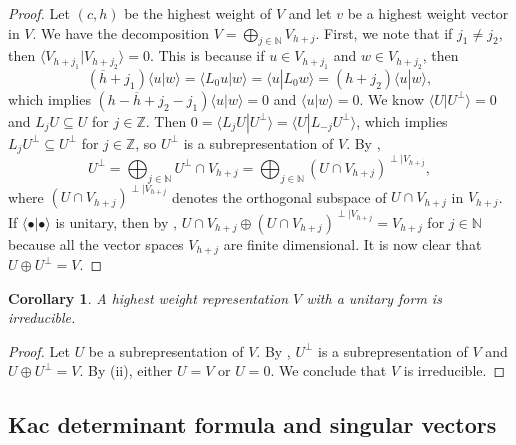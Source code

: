 \documentclass[a4paper, 12pt, reqno]{amsart}
\newtheorem{corollary}[theorem]{Corollary}
\theoremstyle{remark}
\numberwithin{equation}{subsection}
\begin{document}
\begin{proof}
  Let $(c, h)$ be the highest weight of $V$ and let $v$ be a highest weight vector in $V$.
  We have the decomposition $V = \bigoplus_{j \in \mathbb{N}}V_{h + j}$.
  First, we note that if $j_1 \neq j_2$, then $\langle V_{h + j_1}| V_{h + j_2}\rangle = 0$.
  This is because if $u \in V_{h + j_1}$ and $w \in V_{h + j_2}$, then
  \begin{equation*}
    (\overline{h} + j_1)\langle u| w\rangle = \langle L_0u| w\rangle = \langle u| L_0w\rangle = (h + j_2)\langle u| w\rangle,
  \end{equation*}
  which implies $(h - \overline{h} + j_2 - j_1)\langle u| w\rangle = 0$ and $\langle u| w\rangle = 0$.
  We know $\langle U| U^{\perp}\rangle = 0$ and $L_jU \subseteq U$ for $j \in \mathbb{Z}$.
  Then $0 = \langle L_jU| U^{\perp}\rangle = \langle U| L_{-j}U^{\perp}\rangle$, which implies $L_jU^{\perp} \subseteq U^{\perp}$ for $j \in \mathbb{Z}$, so $U^{\perp}$ is a subrepresentation of $V$.
  By ,
  \begin{equation*}
     U^{\perp} = \bigoplus_{j \in \mathbb{N}}U^{\perp} \cap V_{h + j} = \bigoplus_{j \in \mathbb{N}}(U \cap V_{h + j})^{\perp|V_{h + j}},
  \end{equation*}
  where $(U \cap V_{h + j})^{\perp|V_{h + j}}$ denotes the orthogonal subspace of $U \cap V_{h + j}$ in $V_{h + j}$.
  If $\langle \bullet| \bullet\rangle$ is unitary, then by , $U \cap V_{h + j} \oplus (U \cap V_{h + j})^{\perp|V_{h + j}} = V_{h + j}$ for $j \in \mathbb{N}$ because all the vector spaces $V_{h + j}$ are finite dimensional.
  It is now clear that $U \oplus U^{\perp} = V$.
\end{proof}

\begin{corollary}
  \label{crl:2}
  A highest weight representation $V$ with a unitary form is irreducible.
\end{corollary}

\begin{proof}
  Let $U$ be a subrepresentation of $V$.
  By , $U^{\perp}$ is a subrepresentation of $V$ and $U \oplus U^{\perp} = V$.
  By (ii), either $U = V$ or $U = 0$.
  We conclude that $V$ is irreducible.
\end{proof}

\subsection{Kac determinant formula and singular vectors}
\label{sec:kac-dete-form}
\end{document}
